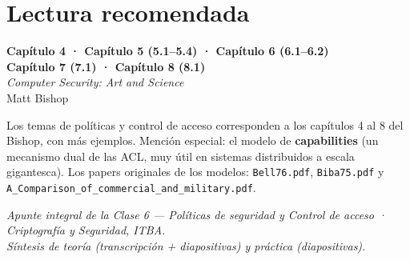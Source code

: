 \documentclass[11pt,a4paper]{article}
\begin{document}
\section*{Lectura recomendada}
\begin{center}
\begin{tcolorbox}[enhanced,colback=itbaBlue!20,colframe=itbaCyanDark,boxrule=1pt,
  arc=3pt,width=0.85\textwidth,halign=center]
\large\textbf{Capítulo 4 \;·\; Capítulo 5 (5.1--5.4) \;·\; Capítulo 6 (6.1--6.2)\\
Capítulo 7 (7.1) \;·\; Capítulo 8 (8.1)}\\[4pt]
\emph{Computer Security: Art and Science}\\[2pt]
Matt Bishop
\end{tcolorbox}
\end{center}
\noindent Los temas de políticas y control de acceso corresponden a los capítulos 4 al 8 del
Bishop, con más ejemplos. Mención especial: el modelo de \textbf{capabilities} (un mecanismo
dual de las ACL, muy útil en sistemas distribuidos a escala gigantesca). Los papers originales
de los modelos: \texttt{Bell76.pdf}, \texttt{Biba75.pdf} y
\texttt{A\_Comparison\_of\_commercial\_and\_military.pdf}.

\vfill
\begin{center}\small\itshape\color{black!60}
Apunte integral de la Clase 6 — Políticas de seguridad y Control de acceso · Criptografía y
Seguridad, ITBA.\\
Síntesis de teoría (transcripción + diapositivas) y práctica (diapositivas).
\end{center}
\end{document}
